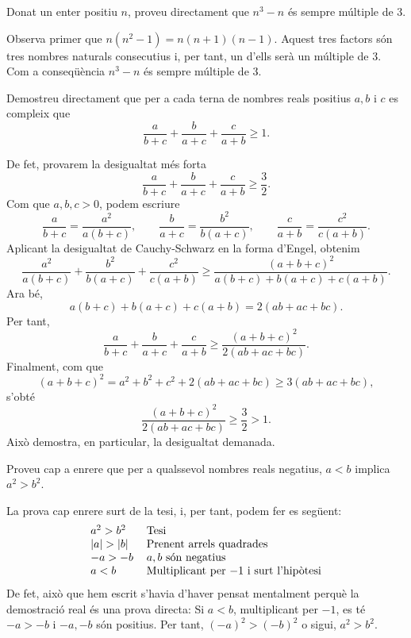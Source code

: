 \begin{exercici}
Donat un enter positiu $n$, proveu directament que $n^{3}-n$ és sempre
múltiple de 3.
\end{exercici}

\begin{solucio}
Observa primer que $n(n^{2}-1)=n(n+1)(n-1)$. Aquest tres factors són tres
nombres naturals consecutius i, per tant, un d'ells serà un múltiple
de 3. Com a conseqüència $n^{3}-n$ és sempre múltiple de 3.
\end{solucio}


\begin{exercici}
Demostreu directament que per a cada terna de nombres reals positius $a,b$ i
$c$ es compleix que
\[
\frac{a}{b+c}+\frac{b}{a+c}+\frac{c}{a+b}\geq1.
\]
\end{exercici}

\begin{solucio}
De fet, provarem la desigualtat més forta
\[
\frac{a}{b+c}+\frac{b}{a+c}+\frac{c}{a+b}\geq \frac32.
\]
Com que $a,b,c>0$, podem escriure
\[
\frac{a}{b+c}=\frac{a^2}{a(b+c)},\qquad
\frac{b}{a+c}=\frac{b^2}{b(a+c)},\qquad
\frac{c}{a+b}=\frac{c^2}{c(a+b)}.
\]
Aplicant la desigualtat de Cauchy-Schwarz en la forma d'Engel, obtenim
\[
\frac{a^2}{a(b+c)}+\frac{b^2}{b(a+c)}+\frac{c^2}{c(a+b)}
\geq
\frac{(a+b+c)^2}{a(b+c)+b(a+c)+c(a+b)}.
\]
Ara bé,
\[
a(b+c)+b(a+c)+c(a+b)=2(ab+ac+bc).
\]
Per tant,
\[
\frac{a}{b+c}+\frac{b}{a+c}+\frac{c}{a+b}
\geq
\frac{(a+b+c)^2}{2(ab+ac+bc)}.
\]
Finalment, com que
\[
(a+b+c)^2=a^2+b^2+c^2+2(ab+ac+bc)\geq 3(ab+ac+bc),
\]
s'obté
\[
\frac{(a+b+c)^2}{2(ab+ac+bc)}\geq \frac32>1.
\]
Això demostra, en particular, la desigualtat demanada.
\end{solucio}

\begin{exercici}
Proveu cap a enrere que per a qualssevol nombres reals negatius, $a<b$ implica
$a^{2}>b^{2}$.
\end{exercici}

\begin{solucio}
La prova cap enrere surt de la tesi, i, per tant, podem fer es següent:%
\[%
\begin{tabular}
[c]{ll}%
$a^{2}>b^{2}$ & Tesi\\
$\left\vert a\right\vert >\left\vert b\right\vert $ & Prenent arrels
quadrades\\
$-a>-b$ & $a,b$ són negatius\\
$a<b$ & Multiplicant per $-1$ i surt l'hipòtesi
\end{tabular}
\]
De fet, això que hem escrit s'havia d'haver pensat mentalment perquè
la demostració real és una prova directa: Si $a<b$, multiplicant per
$-1$, es té $-a>-b$ i $-a,-b$ són positius. Per tant, $\left(
-a\right)  ^{2}>(-b)^{2}$ o sigui, $a^{2}>b^{2}$.
\end{solucio}

